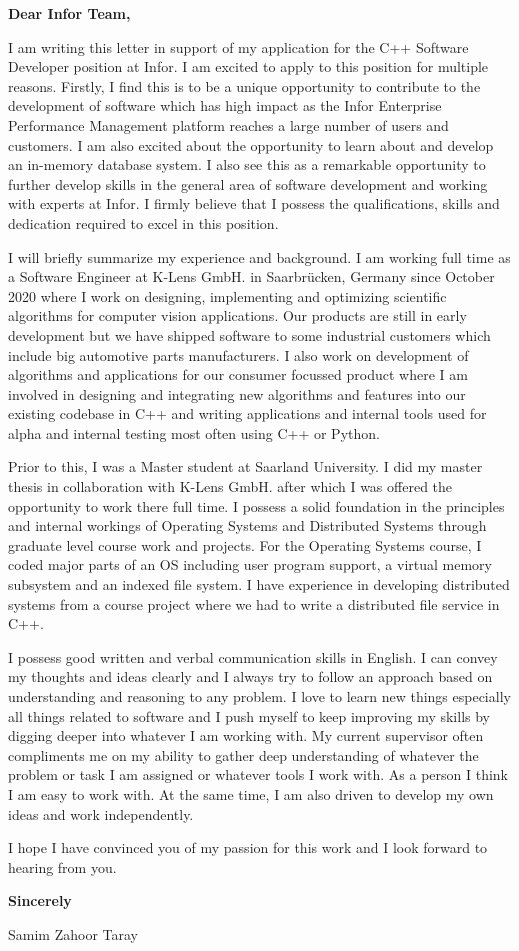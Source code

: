 \documentclass[letterpaper,11pt]{article}
\begin{document}
\textbf{Dear Infor Team,}
\vspace{1cm}


I am writing this letter in support of my application for the C++ Software Developer
position at Infor. I am excited to apply to this position for multiple reasons. Firstly, I
find this is to be a unique opportunity to contribute to the development of software
which has high impact as the Infor Enterprise Performance Management platform
reaches a large number of users and customers. I am also excited about the opportunity to
learn about and develop an in-memory database system. I also see this as a
remarkable opportunity to further develop skills in the general area of software
development and working with experts at Infor. I firmly believe that
I possess the qualifications, skills and dedication required to excel in this
position.


I will briefly summarize my experience and background. I am working full time as
a Software Engineer at K-Lens GmbH. in Saarbr\"ucken, Germany since October 2020
where I work on designing, implementing and optimizing scientific algorithms for computer
vision applications. Our products are still in early development but we have shipped
software to some industrial customers which include big automotive parts manufacturers.
I also work on development of algorithms and applications for our consumer focussed
product where I am involved in designing and integrating new algorithms and features
into our existing codebase in C++ and writing applications and internal tools
used for alpha and internal testing most often using C++ or Python.


Prior to this, I was a Master student at Saarland University. I did my master thesis in
collaboration with K-Lens GmbH. after which I was offered the opportunity to
work there full time. I possess a solid foundation in the principles and
internal workings of Operating Systems and Distributed Systems through graduate
level course work and projects. For the Operating Systems
course, I coded major parts of an OS including user program support, a virtual
memory subsystem and an indexed file system. I have experience in developing
distributed systems from a course project where we had to write a distributed
file service in C++.


I possess good written and verbal communication skills in English. I can convey
my thoughts and ideas clearly and I always try to follow an approach based on
understanding and reasoning to any problem. I love to learn new things
especially all things related to software and I push myself to keep improving
my skills by digging deeper into whatever I am working with. My current supervisor
often compliments me on my ability to gather deep understanding of whatever the
problem or task I am assigned or whatever tools I work with. As a person I
think I am easy to work with. At the same time, I am also driven to develop my
own ideas and work independently.

I hope I have convinced you of my passion for this work and I look forward to
hearing from you.

\vspace{1cm}
\textbf{Sincerely}

Samim Zahoor Taray
\end{document}
